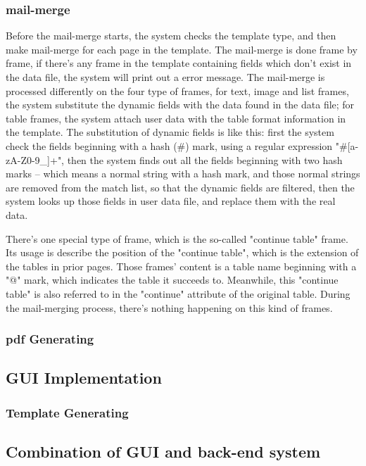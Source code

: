 \documentclass{report}
\begin{document}
\subsubsection{mail-merge}

  Before the mail-merge starts, the system checks the template type, and then make mail-merge for each page in the template. The mail-merge is done frame by frame, if there's any frame in the template containing fields which don't exist in the data file, the system will print out a error message. The mail-merge is processed differently on the four type of frames, for text, image and list frames, the system substitute the dynamic fields with the data found in the data file; for table frames, the system attach user data with the table format information in the template. The substitution of dynamic fields is like this: first the system check the fields beginning with a hash (\#) mark, using a regular expression "\#[a-zA-Z0-9\_]+", then the system finds out all the fields beginning with two hash marks -- which means a normal string with a hash mark, and those normal strings are removed from the match list, so that the dynamic fields are filtered, then the system looks up those fields in user data file, and replace them with the real data. 

  There's one special type of frame, which is the so-called "continue table" frame. Its usage is describe the position of the "continue table", which is the extension of the tables in prior pages. Those frames' content is a table name beginning with a "@" mark, which indicates the table it succeeds to. Meanwhile, this "continue table" is also referred to in the "continue" attribute of the original table. During the mail-merging process, there's nothing happening on this kind of frames.

\subsubsection{pdf Generating}
  

\subsection{GUI Implementation}
\subsubsection{Template Generating}
\subsection{Combination of GUI and back-end system}
\end{document}
